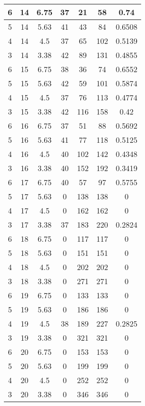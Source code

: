 \documentclass[letterpaper, 12pt]{article}
\begin{document}
\begin{longtable}{|c|c|c|c|c|c|c|}
6 & 14 & 6.75 & 37 & 21 & 58 & 0.74 \\
\hline
5 & 14 & 5.63 & 41 & 43 & 84 & 0.6508 \\
\hline
4 & 14 & 4.5 & 37 & 65 & 102 & 0.5139 \\
\hline
3 & 14 & 3.38 & 42 & 89 & 131 & 0.4855 \\
\hline
6 & 15 & 6.75 & 38 & 36 & 74 & 0.6552 \\
\hline
5 & 15 & 5.63 & 42 & 59 & 101 & 0.5874 \\
\hline
4 & 15 & 4.5 & 37 & 76 & 113 & 0.4774 \\
\hline
3 & 15 & 3.38 & 42 & 116 & 158 & 0.42 \\
\hline
6 & 16 & 6.75 & 37 & 51 & 88 & 0.5692 \\
\hline
5 & 16 & 5.63 & 41 & 77 & 118 & 0.5125 \\
\hline
4 & 16 & 4.5 & 40 & 102 & 142 & 0.4348 \\
\hline
3 & 16 & 3.38 & 40 & 152 & 192 & 0.3419 \\
\hline
6 & 17 & 6.75 & 40 & 57 & 97 & 0.5755 \\
\hline
5 & 17 & 5.63 & 0 & 138 & 138 & 0 \\
\hline
4 & 17 & 4.5 & 0 & 162 & 162 & 0 \\
\hline
3 & 17 & 3.38 & 37 & 183 & 220 & 0.2824 \\
\hline
6 & 18 & 6.75 & 0 & 117 & 117 & 0 \\
\hline
5 & 18 & 5.63 & 0 & 151 & 151 & 0 \\
\hline
4 & 18 & 4.5 & 0 & 202 & 202 & 0 \\
\hline
3 & 18 & 3.38 & 0 & 271 & 271 & 0 \\
\hline
6 & 19 & 6.75 & 0 & 133 & 133 & 0 \\
\hline
5 & 19 & 5.63 & 0 & 186 & 186 & 0 \\
\hline
4 & 19 & 4.5 & 38 & 189 & 227 & 0.2825 \\
\hline
3 & 19 & 3.38 & 0 & 321 & 321 & 0 \\
\hline
6 & 20 & 6.75 & 0 & 153 & 153 & 0 \\
\hline
5 & 20 & 5.63 & 0 & 199 & 199 & 0 \\
\hline
4 & 20 & 4.5 & 0 & 252 & 252 & 0 \\
\hline
3 & 20 & 3.38 & 0 & 346 & 346 & 0 \\
\hline
\end{longtable}
\end{document}
